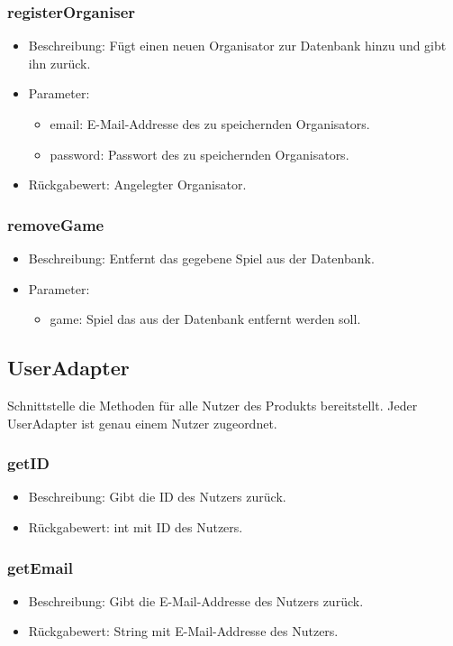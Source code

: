 \documentclass[a4paper]{scrreprt}
\begin{document}
	\subsubsection{registerOrganiser}
	\begin{itemize}
		\item Beschreibung: Fügt einen neuen Organisator zur Datenbank hinzu und gibt ihn zurück.
		\item Parameter:
		\begin{itemize}
			\item email: E-Mail-Addresse des zu speichernden Organisators.
			\item password: Passwort des zu speichernden Organisators.
		\end{itemize}
		\item Rückgabewert: Angelegter Organisator.
	\end{itemize}

	\subsubsection{removeGame}
	\begin{itemize}
		\item Beschreibung: Entfernt das gegebene Spiel aus der Datenbank.
		\item Parameter:
		\begin{itemize}
			\item game: Spiel das aus der Datenbank entfernt werden soll.
		\end{itemize}
	\end{itemize}

	\subsection{UserAdapter}
	Schnittstelle die Methoden für alle Nutzer des Produkts bereitstellt.
	Jeder UserAdapter ist genau einem Nutzer zugeordnet.

	\subsubsection{getID}
	\begin{itemize}
		\item Beschreibung: Gibt die ID des Nutzers zurück.
		\item Rückgabewert: int mit ID des Nutzers.
	\end{itemize}

	\subsubsection{getEmail}
	\begin{itemize}
		\item Beschreibung: Gibt die E-Mail-Addresse des Nutzers zurück.
		\item Rückgabewert: String mit E-Mail-Addresse des Nutzers.
	\end{itemize}
\end{document}
